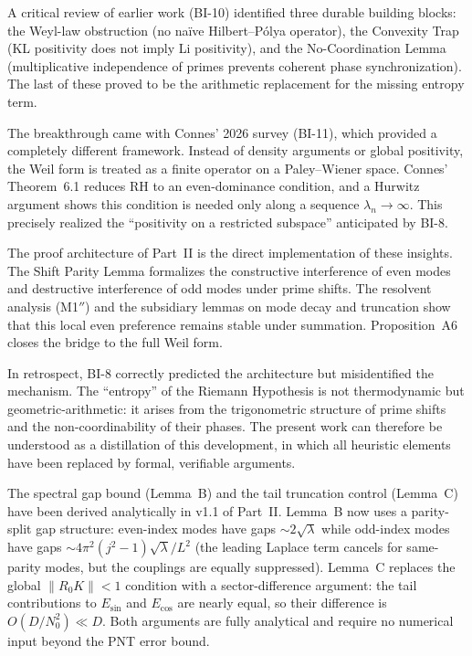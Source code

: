 \documentclass[12pt,a4paper]{article}
\theoremstyle{definition}
\theoremstyle{remark}
\begin{document}
A critical review of earlier work (BI-10) identified three durable building blocks: the Weyl-law obstruction (no na\"ive Hilbert--P\'olya operator), the Convexity Trap (KL positivity does not imply Li positivity), and the No-Coordination Lemma (multiplicative independence of primes prevents coherent phase synchronization). The last of these proved to be the arithmetic replacement for the missing entropy term.

The breakthrough came with Connes' 2026 survey \cite{Connes2025} (BI-11), which provided a completely different framework. Instead of density arguments or global positivity, the Weil form is treated as a finite operator on a Paley--Wiener space. Connes' Theorem~6.1 reduces RH to an even-dominance condition, and a Hurwitz argument shows this condition is needed only along a sequence $\lambda_n \to \infty$. This precisely realized the ``positivity on a restricted subspace'' anticipated by BI-8.

The proof architecture of Part~II is the direct implementation of these insights. The Shift Parity Lemma formalizes the constructive interference of even modes and destructive interference of odd modes under prime shifts. The resolvent analysis (M1$''$) and the subsidiary lemmas on mode decay and truncation show that this local even preference remains stable under summation. Proposition~A6 closes the bridge to the full Weil form.

In retrospect, BI-8 correctly predicted the architecture but misidentified the mechanism. The ``entropy'' of the Riemann Hypothesis is not thermodynamic but geometric-arithmetic: it arises from the trigonometric structure of prime shifts and the non-coordinability of their phases. The present work can therefore be understood as a distillation of this development, in which all heuristic elements have been replaced by formal, verifiable arguments.

The spectral gap bound (Lemma~B) and the tail truncation control (Lemma~C) have been derived analytically in v1.1 of Part~II. Lemma~B now uses a parity-split gap structure: even-index modes have gaps $\sim 2\sqrt{\lambda}$ while odd-index modes have gaps $\sim 4\pi^2(j^2-1)\sqrt{\lambda}/L^2$ (the leading Laplace term cancels for same-parity modes, but the couplings are equally suppressed). Lemma~C replaces the global $\|R_0 K\| < 1$ condition with a sector-difference argument: the tail contributions to $E_{\sin}$ and $E_{\cos}$ are nearly equal, so their difference is $O(D/N_0^2) \ll D$. Both arguments are fully analytical and require no numerical input beyond the PNT error bound.
\end{document}
